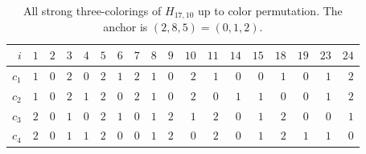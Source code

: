\documentclass[aps,pra,reprint,superscriptaddress,longbibliography,nofootinbib,floatfix,10pt]{revtex4-2}
\theoremstyle{definition}
\begin{document}
\begin{table}[htbp]\centering\small\setlength{\tabcolsep}{3pt}
\caption{All strong three-colorings of $H_{17,10}$ up to color permutation. The anchor is $(2,8,5)=(0,1,2)$.}\label{tab:h17-colors}
\begin{tabular}{rrrrrrrrrrrrrrrrrr}
\toprule $i$ & $1$ & $2$ & $3$ & $4$ & $5$ & $6$ & $7$ & $8$ & $9$ & $10$ & $11$ & $14$ & $15$ & $18$ & $19$ & $23$ & $24$\\\midrule
$c_1$ & $1$ & $0$ & $2$ & $0$ & $2$ & $1$ & $2$ & $1$ & $0$ & $2$ & $1$ & $0$ & $0$ & $1$ & $0$ & $1$ & $2$\\
$c_2$ & $1$ & $0$ & $2$ & $1$ & $2$ & $0$ & $2$ & $1$ & $0$ & $2$ & $0$ & $1$ & $1$ & $0$ & $0$ & $1$ & $2$\\
$c_3$ & $2$ & $0$ & $1$ & $0$ & $2$ & $1$ & $0$ & $1$ & $2$ & $1$ & $2$ & $0$ & $1$ & $2$ & $0$ & $0$ & $1$\\
$c_4$ & $2$ & $0$ & $1$ & $1$ & $2$ & $0$ & $0$ & $1$ & $2$ & $0$ & $2$ & $0$ & $1$ & $2$ & $1$ & $1$ & $0$\\
\bottomrule\end{tabular}\end{table}
\end{document}
